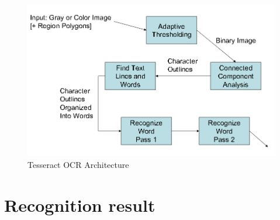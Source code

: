 	\begin{figure}[H]
		\centering
		\includegraphics[scale=0.5]{Chapters/Fig/tesseract_arch.png}
		\caption{Tesseract OCR Architecture \cite{tesseract_oscon}}
		\label{fig:tesseract_arch}
	\end{figure}

\section{Recognition result}
